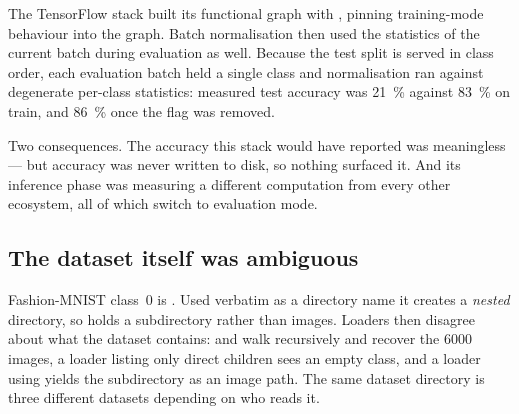 The TensorFlow stack built its functional graph with
, pinning training-mode behaviour into the
graph. Batch normalisation then used the statistics of the current batch during
evaluation as well. Because the test split is served in class order, each
evaluation batch held a single class and normalisation ran against degenerate
per-class statistics: measured test accuracy was \SI{21}{\percent} against
\SI{83}{\percent} on train, and \SI{86}{\percent} once the flag was removed.

Two consequences. The accuracy this stack would have reported was meaningless ---
but accuracy was never written to disk, so nothing surfaced it. And its inference
phase was measuring a different computation from every other ecosystem, all of
which switch to evaluation mode.

\subsection{The dataset itself was ambiguous}

Fashion-MNIST class~0 is . Used verbatim as a directory name it
creates a \emph{nested} directory, so  holds a 
subdirectory rather than images. Loaders then disagree about what the dataset
contains:  and  walk recursively and
recover the \num{6000} images, a loader listing only direct children sees an empty
class, and a loader using  yields the subdirectory as an image
path. The same dataset directory is three different datasets depending on who
reads it.
